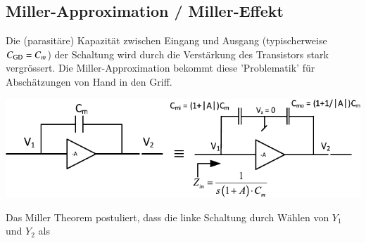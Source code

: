 






\subsection{Miller-Approximation / Miller-Effekt}

Die (parasitäre) Kapazität zwischen Eingang und Ausgang (typischerweise $C_{\rm GD} = C_m$) der Schaltung wird durch die Verstärkung des Transistors stark vergrössert.
Die Miller-Approximation bekommt diese 'Problematik' für Abschätzungen von Hand in den Griff.

\begin{center}
    \includegraphics[width=0.85\columnwidth]{images/08_Miller_C.pdf}
\end{center}


Das Miller Theorem postuliert, dass die linke Schaltung durch Wählen von $Y_1$ und $Y_2$ als 

\vspace{-0.2cm}

